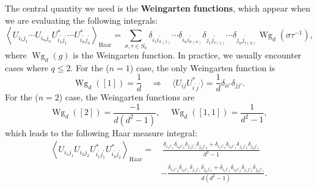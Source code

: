 \documentclass{SciPost}
\begin{document}
The central quantity we need is the \textbf{Weingarten functions}, which appear when we are evaluating the following integrals:
\begin{equation}\label{eq:haar-integral}
	\left\langle U_{i_1 j_1} \cdots U_{i_n j_n} U_{i_1^{\prime} j_1^{\prime}}^* \cdots U_{i_n^{\prime} j_n^{\prime}}^* \right\rangle_\text{Haar}
	= \sum_{\sigma, \tau \in S_k} \delta_{i_1 i_{\sigma(1)}^{\prime}} \cdots \delta_{i_n i_{\sigma(n)}^{\prime}} \delta_{j_1 j_{\tau(1)}^{\prime}} \cdots \delta_{j_n j_{\tau(n)}^{\prime}} \operatorname{Wg}_d\left(\sigma \tau^{-1}\right),
\end{equation}
where $\operatorname{Wg}_d(g)$ is the Weingarten function.
In practice, we usually encounter cases where $q\le 2$.
For the ($n=1$) case, the only Weingarten function is
\begin{equation}
	\operatorname{Wg}_d([1]) = \frac{1}{d} \quad\Longrightarrow\quad
	\langle U_{i j} U_{i^{\prime} j^{\prime}}^* \rangle = \frac{1}{d}\delta_{ii'}\delta_{jj'}.
\end{equation}
For the ($n=2$) case, the Weingarten functions are
\begin{equation}
	\operatorname{Wg}_d([2])=\frac{-1}{d\left(d^2-1\right)}, \quad
	\operatorname{Wg}_d\left([1,1]\right)=\frac{1}{d^2-1},
\end{equation}
which leads to the following Haar measure integral:
\begin{equation}
\begin{aligned}
	\left\langle U_{i_1 j_1} U_{i_2 j_2} U_{i_1^{\prime} j_1^{\prime}}^* U_{i_2^{\prime} j_2^{\prime}}^* \right\rangle_\text{Haar}
	=&\ \frac{
		\delta_{i_1 i'_1}\delta_{i_2 i'_2}\delta_{j_1 j'_1}\delta_{j_2 j'_2} + 
		\delta_{i_1 i'_2}\delta_{i_2 i'_1}\delta_{j_1 j'_2}\delta_{j_2 j'_1}
	}{d^2-1} \\
	& -\frac{
		\delta_{i_1 i'_2}\delta_{i_2 i'_1}\delta_{j_1 j'_1}\delta_{j_2 j'_2} + 
		\delta_{i_1 i'_1}\delta_{i_2 i'_2}\delta_{j_1 j'_2}\delta_{j_2 j'_1}
	}{d(d^2-1)}.
\end{aligned}
\end{equation} 
\end{document}
